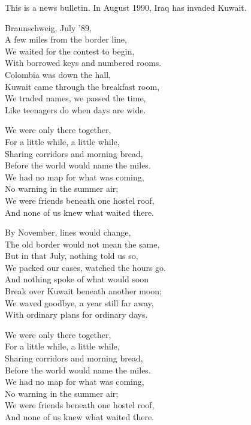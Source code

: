 \begin{lyrics}
This is a news bulletin. In August 1990, Iraq has invaded Kuwait.

Braunschweig, July ’89,\\
A few miles from the border line,\\
We waited for the contest to begin,\\
With borrowed keys and numbered rooms.\\
Colombia was down the hall,\\
Kuwait came through the breakfast room,\\
We traded names, we passed the time,\\
Like teenagers do when days are wide.

We were only there together,\\
For a little while, a little while,\\
Sharing corridors and morning bread,\\
Before the world would name the miles.\\
We had no map for what was coming,\\
No warning in the summer air;\\
We were friends beneath one hostel roof,\\
And none of us knew what waited there.

By November, lines would change,\\
The old border would not mean the same,\\
But in that July, nothing told us so,\\
We packed our cases, watched the hours go.\\
And nothing spoke of what would soon\\
Break over Kuwait beneath another moon;\\
We waved goodbye, a year still far away,\\
With ordinary plans for ordinary days.

We were only there together,\\
For a little while, a little while,\\
Sharing corridors and morning bread,\\
Before the world would name the miles.\\
We had no map for what was coming,\\
No warning in the summer air;\\
We were friends beneath one hostel roof,\\
And none of us knew what waited there.


\end{lyrics}
